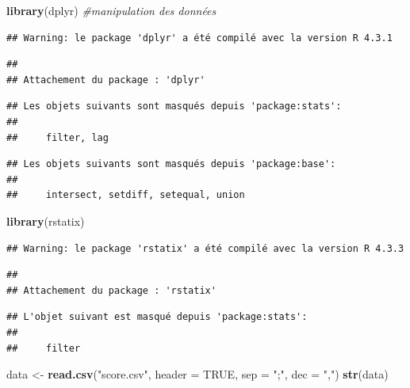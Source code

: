 \documentclass[
]{book}
\newenvironment{Shaded}{\begin{snugshade}}{\end{snugshade}}
\newcommand{\AttributeTok}[1]{\textcolor[rgb]{0.13,0.29,0.53}{#1}}
\newcommand{\CommentTok}[1]{\textcolor[rgb]{0.56,0.35,0.01}{\textit{#1}}}
\newcommand{\ConstantTok}[1]{\textcolor[rgb]{0.56,0.35,0.01}{#1}}
\newcommand{\FunctionTok}[1]{\textcolor[rgb]{0.13,0.29,0.53}{\textbf{#1}}}
\newcommand{\NormalTok}[1]{#1}
\newcommand{\OtherTok}[1]{\textcolor[rgb]{0.56,0.35,0.01}{#1}}
\newcommand{\StringTok}[1]{\textcolor[rgb]{0.31,0.60,0.02}{#1}}
\begin{document}
\begin{Shaded}
\begin{Highlighting}[]
\FunctionTok{library}\NormalTok{(dplyr) }\CommentTok{\#manipulation des données}
\end{Highlighting}
\end{Shaded}

\begin{verbatim}
## Warning: le package 'dplyr' a été compilé avec la version R 4.3.1
\end{verbatim}

\begin{verbatim}
## 
## Attachement du package : 'dplyr'
\end{verbatim}

\begin{verbatim}
## Les objets suivants sont masqués depuis 'package:stats':
## 
##     filter, lag
\end{verbatim}

\begin{verbatim}
## Les objets suivants sont masqués depuis 'package:base':
## 
##     intersect, setdiff, setequal, union
\end{verbatim}

\begin{Shaded}
\begin{Highlighting}[]
\FunctionTok{library}\NormalTok{(rstatix)}
\end{Highlighting}
\end{Shaded}

\begin{verbatim}
## Warning: le package 'rstatix' a été compilé avec la version R 4.3.3
\end{verbatim}

\begin{verbatim}
## 
## Attachement du package : 'rstatix'
\end{verbatim}

\begin{verbatim}
## L'objet suivant est masqué depuis 'package:stats':
## 
##     filter
\end{verbatim}

\begin{Shaded}
\begin{Highlighting}[]
\NormalTok{data }\OtherTok{\textless{}{-}} \FunctionTok{read.csv}\NormalTok{(}\StringTok{"score.csv"}\NormalTok{, }\AttributeTok{header =} \ConstantTok{TRUE}\NormalTok{, }\AttributeTok{sep =} \StringTok{";"}\NormalTok{, }\AttributeTok{dec =} \StringTok{","}\NormalTok{)}
\FunctionTok{str}\NormalTok{(data)}
\end{Highlighting}
\end{Shaded}
\end{document}
